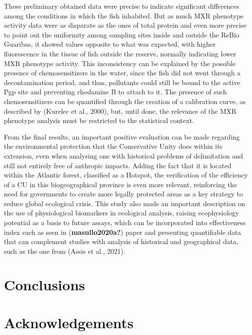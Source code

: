 \documentclass[
  american,
  letterpaper,
  DIV=11,
  numbers=noendperiod]{scrartcl}
\begin{document}
These preliminary obtained data were precise to indicate significant
differences among the conditions in which the fish inhabited. But as
much MXR phenotype activity data were as disparate as the ones of total
protein and even more precise to point out the uniformity among sampling
sites inside and outside the ReBio Guaribas, it showed values opposite
to what was expected, with higher fluorescence in the tissue of fish
outside the reserve, normally indicating lower MXR phenotype activity.
This inconsistency can be explained by the possible presence of
chemosensitizers in the water, since the fish did not went through a
decontamination period, and thus, pollutants could still be bound to the
active Pgp site and preventing rhodamine B to attach to it. The presence
of such chemosensitizers can be quantified through the creation of a
calibration curve, as described by (Kurelec et al., 2000), but, until
done, the relevance of the MXR phenotype analysis must be restricted to
the statistical context.

From the final results, an important positive evaluation can be made
regarding the environmental protection that the Conservative Unity does
within its extension, even when analysing one with historical problems
of delimitation and still not entirely free of anthropic impacts. Adding
the fact that it is located within the Atlantic forest, classified as a
Hotspot, the verification of the efficiency of a CU in this
biogeographical province is even more relevant, reinforcing the need for
governments to create more legally protected areas as a key strategy to
reduce global ecological crisis. This study also made an important
description on the use of physiological biomarkers in ecological
analysis, raising ecophysiology potential as a basis to future assays,
which can be incorporated into effectiveness index such as seen in
(\textbf{masullo2020a?}) paper and presenting quantifiable data that can
complement studies with analysis of historical and geographical data,
such as the one from (Assis et al., 2021).

\section*{Conclusions}\label{conclusions}

\section*{Acknowledgements}\label{acknowledgements}
\end{document}

